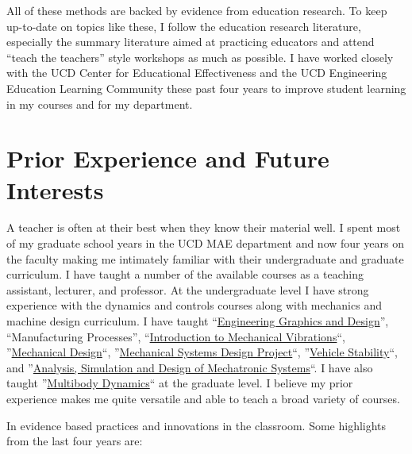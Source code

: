 \documentclass{article}
\begin{document}
All of these methods are backed by evidence from education research. To keep
up-to-date on topics like these, I follow the education research literature,
especially the summary literature aimed at practicing educators and attend
``teach the teachers'' style workshops as much as possible. I have worked
closely with the UCD Center for Educational Effectiveness and the UCD
Engineering Education Learning Community these past four years to improve
student learning in my courses and for my department.

\section*{Prior Experience and Future Interests}
%
A teacher is often at their best when they know their material well. I spent
most of my graduate school years in the UCD MAE department and now four years
on the faculty making me intimately familiar with their undergraduate and
graduate curriculum. I have taught a number of the available courses as a
teaching assistant, lecturer, and professor. At the undergraduate level I have
strong experience with the dynamics and controls courses along with mechanics
and machine design curriculum. I have taught
``\href{http://www.moorepants.info/jkm/courses/eng4}{Engineering Graphics and
Design}'',
``Manufacturing Processes'',
``\href{http://moorepants.github.io/eng122}{Introduction to Mechanical
Vibrations}``,
''\href{http://moorepants.github.io/eme150a}{Mechanical Design}``,
''\href{https://moorepants.github.io/eme185}{Mechanical Systems Design Project}``,
''\href{https://moorepants.github.io/eme134}{Vehicle Stability}``,
and ''\href{https://moorepants.github.io/eme171}{Analysis, Simulation and
Design of Mechatronic Systems}``.
I have also taught ''\href{https://moorepants.github.io/mae223}{Multibody
Dynamics}`` at the graduate level. I believe my
prior experience makes me quite versatile and able to teach a broad variety of
courses.

In evidence based practices and innovations in the classroom. Some highlights
from the last four years are:
\end{document}
